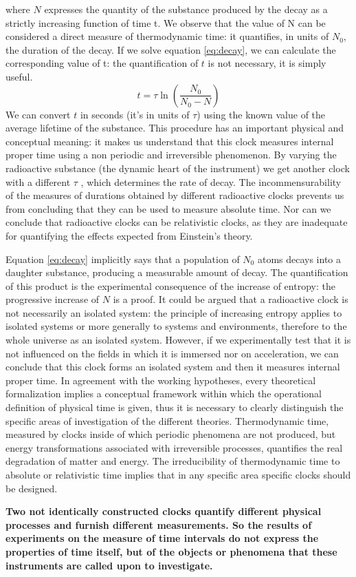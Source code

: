 \documentclass[%
 aapm,
 mph,%
 amsmath,amssymb,
 reprint,%
]{revtex4-2}
\begin{document}
where $N$ expresses the quantity of the substance produced by the decay
as a strictly increasing function of time t. We observe that the value
of N can be considered a direct measure of thermodynamic time: it
quantifies, in units of $N_0$, the duration of the decay. If we solve equation \ref{eq:decay}, we can calculate the corresponding value of t: the quantification of
$t$ is not necessary, it is simply useful.
\begin{equation}\label{eq:deacytime}
    t = \tau \ln \left( \frac{N_0}{N_0 - N}\right)
\end{equation}
We can convert $t$ in seconds (it's in units of $\tau$) using the known value of the average lifetime of the substance. This procedure has an important physical and conceptual meaning: it makes us understand that this clock measures internal proper time using a non periodic and irreversible phenomenon. By varying the radioactive substance (the dynamic heart of the instrument) we get another clock with a different $\tau$ , which
determines the rate of decay. The incommensurability of the measures
of durations obtained by different radioactive clocks prevents us from
concluding that they can be used to measure absolute time. Nor can we
conclude that radioactive clocks can be relativistic clocks, as they are
inadequate for quantifying the effects expected from Einstein’s theory.

Equation \ref{eq:decay} implicitly says that a
population of $N_0$ atoms decays into a daughter substance, producing a
measurable amount of decay. The quantification of this product is the
experimental consequence of the increase of entropy: the progressive increase of $N$ is a proof. It could be argued that a radioactive clock is not necessarily an isolated system: the principle of increasing entropy applies to isolated systems or more generally to systems and environments, therefore to the whole universe as an isolated system. However, if we experimentally test that it is not influenced on the fields in which it is immersed nor on acceleration, we can conclude that this clock forms an isolated system and then it measures internal proper time. In agreement with the working hypotheses, every theoretical
formalization implies a conceptual framework within which the operational definition of physical time is given, thus it is necessary to clearly distinguish the specific areas of investigation of the different theories. Thermodynamic time, measured by clocks inside of which periodic phenomena are not produced, but energy transformations associated with irreversible processes, quantifies the real degradation of matter and energy. The irreducibility of thermodynamic time to absolute or relativistic time implies that in any specific area specific clocks should be designed.

\textbf{Two not identically constructed clocks quantify different physical processes and furnish different measurements. So the results of experiments on the measure of time intervals do not express the properties of time itself, but of the objects or phenomena that these instruments are called upon to investigate.}

\end{document}
